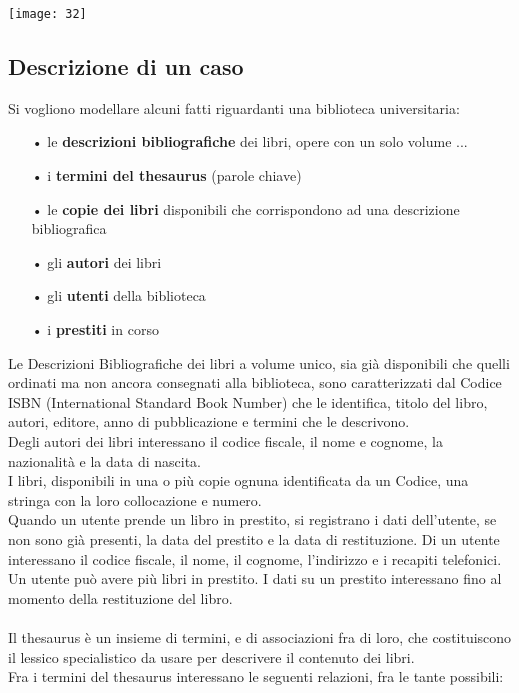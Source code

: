 \documentclass[12pt, letterpaper]{article}
\begin{document}
\texttt{[image: 32]}

\subsection{Descrizione di un caso}

Si vogliono modellare alcuni fatti riguardanti una biblioteca universitaria:

\begin{itemize}
   \item[•] le \textbf{descrizioni bibliografiche} dei libri, opere con un solo volume ...
   \item[•] i \textbf{termini del thesaurus} (parole chiave)
   \item[•] le \textbf{copie dei libri} disponibili che corrispondono ad una descrizione bibliografica
   \item[•] gli \textbf{autori} dei libri 
   \item[•] gli \textbf{utenti} della biblioteca
   \item[•] i \textbf{prestiti} in corso 
\end{itemize}
Le Descrizioni Bibliografiche dei libri a volume unico, sia già disponibili che quelli
ordinati ma non ancora consegnati alla biblioteca, sono caratterizzati dal Codice
ISBN (International Standard Book Number) che le identifica, titolo del libro, autori,
editore, anno di pubblicazione e termini che le descrivono.\\
Degli autori dei libri interessano il codice fiscale, il nome e cognome, la nazionalità
e la data di nascita.\\
I libri, disponibili in una o più copie ognuna identificata da un Codice, una stringa
con la loro collocazione e numero.\\
Quando un utente prende un libro in prestito, si registrano i dati dell'utente, se non
sono già presenti, la data del prestito e la data di restituzione. Di un utente
interessano il codice fiscale, il nome, il cognome, l'indirizzo e i recapiti telefonici.
Un utente può avere più libri in prestito. I dati su un prestito interessano fino al
momento della restituzione del libro.\\
\\
Il thesaurus è un insieme di termini, e di associazioni fra di loro, che costituiscono il
lessico specialistico da usare per descrivere il contenuto dei libri.\\
Fra i termini del thesaurus interessano le seguenti relazioni, fra le tante possibili:
\end{document}
